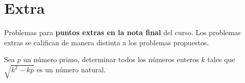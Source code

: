 \newpage
\section{Extra}

Problemas para \textbf{puntos extras en la nota final} del curso.
Los problemas extras se califican de manera distinta a los problemas propuestos.

\begin{problem}
    Sea $p$ un número primo, determinar todos los números enteros $k$ tales que $\sqrt {k^2 - kp}$ es un número natural.
\end{problem}